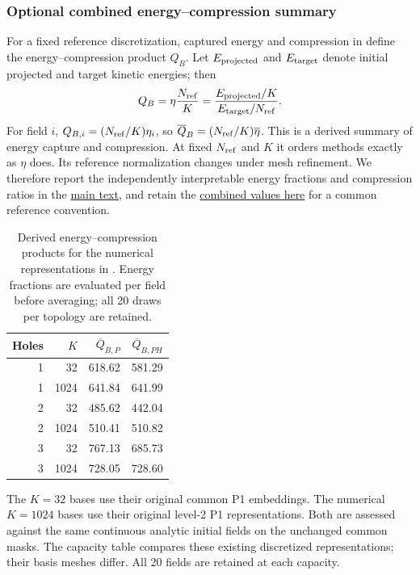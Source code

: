 \subsubsection{Optional combined energy--compression summary}
\label{app:basis-quality}
For a fixed reference discretization, captured energy and compression in  define the energy--compression product $Q_B$. Let $E_{\rm projected}$ and $E_{\rm target}$ denote initial projected and target kinetic energies; then
\begin{equation}
Q_B=\eta\frac{N_{\rm ref}}{K}
=\frac{E_{\rm projected}/K}{E_{\rm target}/N_{\rm ref}}.
\label{eq:basis-energy-quality}
\end{equation}
For field $i$, $Q_{B,i}=(N_{\rm ref}/K)\eta_i$, so $\overline Q_B=(N_{\rm ref}/K)\overline\eta$. This is a derived summary of energy capture and compression. At fixed $N_{\rm ref}$ and $K$ it orders methods exactly as $\eta$ does. Its reference normalization changes under mesh refinement. We therefore report the independently interpretable energy fractions and compression ratios in the \hyperref[fig:random-k1024-energy]{main text}, and retain the \hyperref[tab:basis-quality]{combined values here} for a common reference convention.
\begin{table}[!htb]\centering\small
\caption{Derived energy--compression products for the numerical representations in . Energy fractions are evaluated per field before averaging; all 20 draws per topology are retained.}
\label{tab:basis-quality}
\begin{tabular}{rrrr}\toprule
Holes&$K$&$\overline Q_{B,P}$&$\overline Q_{B,PH}$\\\midrule
1&32&618.62&581.29\\
1&1024&641.84&641.99\\
2&32&485.62&442.04\\
2&1024&510.41&510.82\\
3&32&767.13&685.73\\
3&1024&728.05&728.60\\
\bottomrule\end{tabular}\end{table}

The $K=32$ bases use their original common P1 embeddings. The numerical $K=1024$ bases use their original level-2 P1 representations. Both are assessed against the same continuous analytic initial fields on the unchanged common masks. The capacity table compares these existing discretized representations; their basis meshes differ. All 20 fields are retained at each capacity.

